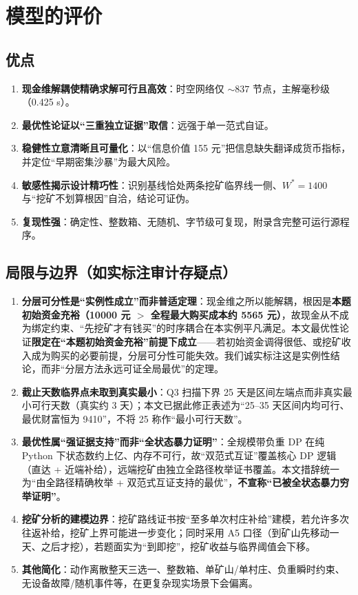 \documentclass[12pt,a4paper]{ctexart}
\begin{document}
\section{模型的评价}

\subsection{优点}
\begin{enumerate}
  \item \textbf{现金维解耦使精确求解可行且高效}：时空网络仅 ${\sim}837$ 节点，主解毫秒级（0.425 s）。
  \item \textbf{最优性论证以“三重独立证据”取信}：远强于单一范式自证。
  \item \textbf{稳健性立意清晰且可量化}：以“信息价值 155 元”把信息缺失翻译成货币指标，并定位“早期密集沙暴”为最大风险。
  \item \textbf{敏感性揭示设计精巧性}：识别基线恰处两条挖矿临界线一侧、$W^*=1400$ 与“挖矿不划算根因”自洽，结论可证伪。
  \item \textbf{复现性强}：确定性、整数箱、无随机、字节级可复现，附录含完整可运行源程序。
\end{enumerate}

\subsection{局限与边界（如实标注审计存疑点）}
\begin{enumerate}
  \item \textbf{分层可分性是“实例性成立”而非普适定理}：现金维之所以能解耦，根因是\textbf{本题初始资金充裕（10000 元 $>$ 全程最大购买成本约 5565 元）}，故现金从不成为绑定约束、“先挖矿才有钱买”的时序耦合在本实例平凡满足。本文最优性论证\textbf{限定在“本题初始资金充裕”前提下成立}——若初始资金调得很低、或挖矿收入成为购买的必要前提，分层可分性可能失效。我们诚实标注这是实例性结论，而非“分层方法永远可证全局最优”的定理。
  \item \textbf{截止天数临界点未取到真实最小}：Q3 扫描下界 25 天是区间左端点而非真实最小可行天数（真实约 3 天）；本文已据此修正表述为“25–35 天区间内均可行、最优财富恒为 9410”，不将 25 称作“最小可行天数”。
  \item \textbf{最优性属“强证据支持”而非“全状态暴力证明”}：全规模带负重 DP 在纯 Python 下状态数约上亿、内存不可行，故“双范式互证”覆盖核心 DP 逻辑（直达 + 近端补给），远端挖矿由独立全路径枚举证书覆盖。本文措辞统一为“由全路径精确枚举 + 双范式互证支持的最优”，\textbf{不宣称“已被全状态暴力穷举证明”}。
  \item \textbf{挖矿分析的建模边界}：挖矿路线证书按“至多单次村庄补给”建模，若允许多次往返补给，挖矿上界可能进一步变化；同时采用 A5 口径（到矿山先移动一天、之后才挖），若题面实为“到即挖”，挖矿收益与临界阈值会下移。
  \item \textbf{其他简化}：动作离散整天三选一、整数箱、单矿山/单村庄、负重瞬时约束、无设备故障/随机事件等，在更复杂现实场景下会偏离。
\end{enumerate}
\end{document}
